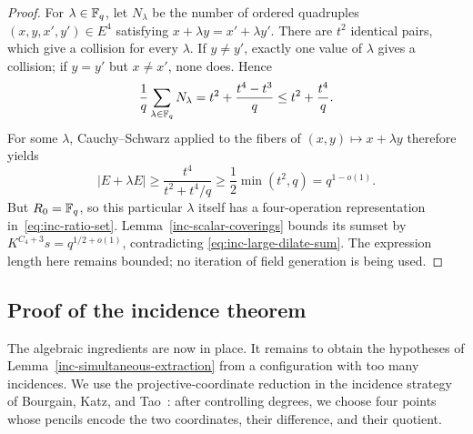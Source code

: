 \begin{proof}
For $\lambda\in\mathbb F_q$, let $N_\lambda$ be the number of ordered
quadruples $(x,y,x',y')\in E^4$ satisfying
$x+\lambda y=x'+\lambda y'$. There are $t^2$ identical pairs,
which give a collision for every $\lambda$. If $y\ne y'$, exactly
one value of $\lambda$ gives a collision; if $y=y'$ but $x\ne x'$,
none does. Hence
\begin{equation}\label{eq:inc-average-collisions}
 \frac1q\sum_{\lambda\in\mathbb F_q}N_\lambda
 =t^2+\frac{t^4-t^3}{q}
 \le t^2+\frac{t^4}{q}.
\end{equation}
For some $\lambda$, Cauchy--Schwarz applied to the fibers of
$(x,y)\mapsto x+\lambda y$ therefore yields
\begin{equation}\label{eq:inc-large-dilate-sum}
 |E+\lambda E|
 \ge\frac{t^4}{t^2+t^4/q}
 \ge\frac12\min(t^2,q)
 =q^{1-o(1)}.
\end{equation}
But $R_0=\mathbb F_q$, so this particular $\lambda$ itself has a
four-operation representation in~\eqref{eq:inc-ratio-set}.
Lemma~\ref{inc-scalar-coverings} bounds its sumset by
$K^{C_4+3}s=q^{1/2+o(1)}$, contradicting
\eqref{eq:inc-large-dilate-sum}. The expression length here remains
bounded; no iteration of field generation is being used.
\end{proof}

\subsection{Proof of the incidence theorem}

The algebraic ingredients are now in place. It remains to obtain the
hypotheses of Lemma~\ref{inc-simultaneous-extraction} from a configuration
with too many incidences. We use the projective-coordinate reduction
in the incidence strategy of Bourgain, Katz, and
Tao~\cite[Section 6]{BKT2004}: after controlling degrees, we choose four
points whose pencils encode the two coordinates, their difference,
and their quotient.

